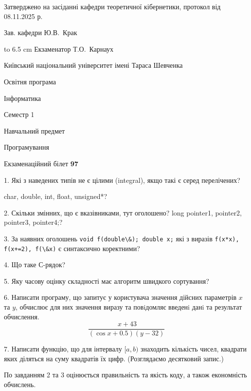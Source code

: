 \documentclass[12pt, ukrainian]{article}
\def\code#1{\Verb!#1!}
\begin{document}
{\smallskip\smallskip \begin {scriptsize} Затверджено на засіданні кафедри теоретичної кібернетики, протокол   від   08.11.2025 р.\par\smallskip\smallskip\smallskip\smallskip
{\parbox {6.5 cm} {Зав. кафедри \dotfill Ю.В.~Крак}}\hspace {0.7cm} {\hbox to 6.5 cm { Екзаменатор \dotfill Т.О.~Карнаух}} \end{scriptsize}}
\newpage
{{\begin {scriptsize}\par
{ \center  Київський національний університет імені Тараса Шевченка \par}
{\parbox {5 cm}{Освітня програма \hfill}{\parbox {7 cm}{Інформатика\hfill}}\parbox {6 cm}{\hfill Семестр 1}}\par
{\parbox {5 cm} {Навчальний предмет \hfill}\parbox {7 cm}{Програмування \hfill}\parbox {6cm}{\hfill}\par}\vspace{-15pt} \end{scriptsize}}{\center Екзаменаційний білет \No \textbf { 97 }\par}}
{%
1. Які з наведених типів не є цілими (integral), якщо такі є серед перелічених?

char, double, int, float, unsigned*?
\par
\vspace{2mm}
2. Скільки змінних, що є вказівниками, тут оголошено?
long pointer1, pointer2, pointer3, pointer4;?
\par
\vspace{2mm}
3. За наявних оголошень \code{void f(double\&); double x;} які з виразів \code{f(x*x), f(x+=2), f(\&x)} є синтаксично коректними?
\par
\vspace{2mm}
4. Що таке С-рядок?
\par
\vspace{2mm}
5. Яку часову оцінку складності має алгоритм швидкого сортування?
\par
\vspace{2mm}
6. Написати програму, що запитує у користувача значення дійсних параметрів $x$ та $y$, обчислює для них значення виразу та повiдомляє введенi данi та результат обчислення.
$$\frac{\ x + 43}{(\cos x + 0.5) (y - 32)}$$ 

\par
7. Написати функцію, що для інтервалу $[a, b)$ знаходить кількість чисел, квадрати яких діляться на суму квадратів їх цифр. (Розглядаємо десятковий запис.)

По завданням 2 та 3 оцінюється правильність та якість коду, а також економність обчислень.

}
\end{document}
